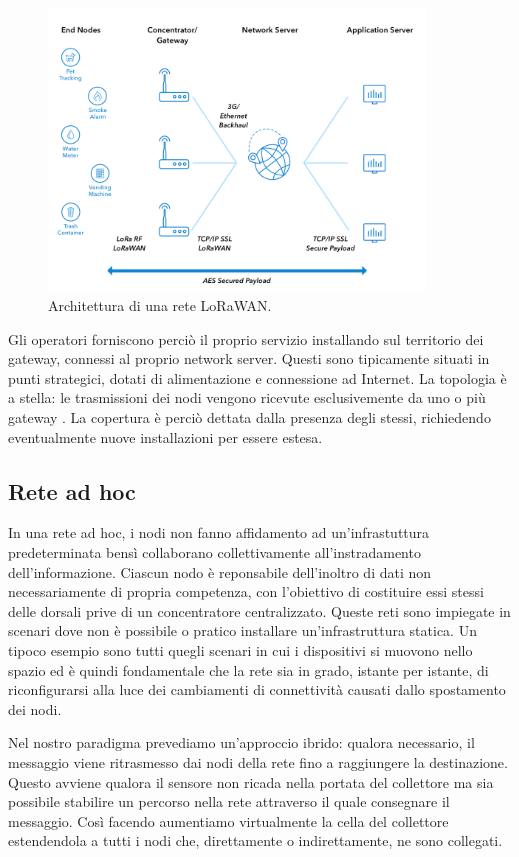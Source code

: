 \documentclass[a4paper,12pt]{article}
\theoremstyle{definition}
\begin{document}
\begin{figure}[H]
\centering
\includegraphics[width=10cm]{figures/lorawan.png}
\caption{Architettura di una rete LoRaWAN.}
\end{figure}


Gli operatori forniscono perciò il proprio servizio installando sul territorio dei gateway, connessi al proprio network server. Questi sono tipicamente situati in punti strategici, dotati di alimentazione e connessione ad Internet. La topologia è a stella: le trasmissioni dei nodi vengono ricevute esclusivemente da uno o più gateway \cite{loraspec}. La copertura è perciò dettata dalla presenza degli stessi, richiedendo eventualmente nuove installazioni per essere estesa.

\subsection{Rete ad hoc}

In una rete ad hoc, i nodi non fanno affidamento ad un'infrastuttura predeterminata bensì collaborano collettivamente all'instradamento dell'informazione. Ciascun nodo è reponsabile dell'inoltro di dati non necessariamente di propria competenza, con l'obiettivo di costituire essi stessi delle dorsali prive di un concentratore centralizzato. Queste reti sono impiegate in scenari dove non è possibile o pratico installare un'infrastruttura statica. Un tipoco esempio sono tutti quegli scenari in cui i dispositivi si muovono nello spazio ed è quindi fondamentale che la rete sia in grado, istante per istante, di riconfigurarsi alla luce dei cambiamenti di connettività causati dallo spostamento dei nodi.

Nel nostro paradigma prevediamo un'approccio ibrido: qualora necessario, il messaggio viene ritrasmesso dai nodi della rete fino a raggiungere la destinazione. Questo avviene qualora il sensore non ricada nella portata del collettore ma sia possibile stabilire un percorso nella rete attraverso il quale consegnare il messaggio. Così facendo aumentiamo virtualmente la cella del collettore estendendola a tutti i nodi che, direttamente o indirettamente, ne sono collegati.
\end{document}
